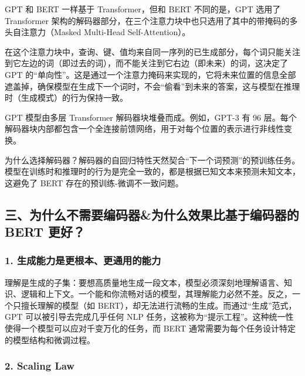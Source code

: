 GPT 和 BERT 一样基于 Transformer，但和 BERT 不同的是，GPT 选用了 Transformer 架构的解码器部分，在三个注意力块中也只选用了其中的带掩码的多头自注意力（Masked Multi-Head Self-Attention）。

在这个注意力块中，查询、键、值均来自同一序列的已生成部分，每个词只能关注到它左边的词（即过去的词），而不能关注到它右边（即未来）的词，这决定了 GPT 的``单向性''。这是通过一个注意力掩码来实现的，它将未来位置的信息全部遮盖掉，确保模型在生成下一个词时，不会``偷看''到未来的答案，这与模型在推理时（生成模式）的行为保持一致。

GPT 模型由多层 Transformer 解码器块堆叠而成。例如，GPT-3 有 96 层。每个解码器块内部都包含一个全连接前馈网络，用于对每个位置的表示进行非线性变换。

为什么选择解码器？解码器的自回归特性天然契合``下一个词预测''的预训练任务。模型在训练时和推理时的行为是完全一致的，都是根据已知文本来预测未知文本，这避免了 BERT 存在的预训练-微调不一致问题。

\hypertarget{ux4e09ux4e3aux4ec0ux4e48ux4e0dux9700ux8981ux7f16ux7801ux5668ux4e3aux4ec0ux4e48ux6548ux679cux6bd4ux57faux4e8eux7f16ux7801ux5668ux7684-bert-ux66f4ux597d}{%
\subsection{三、为什么不需要编码器\&为什么效果比基于编码器的 BERT 更好？}\label{ux4e09ux4e3aux4ec0ux4e48ux4e0dux9700ux8981ux7f16ux7801ux5668ux4e3aux4ec0ux4e48ux6548ux679cux6bd4ux57faux4e8eux7f16ux7801ux5668ux7684-bert-ux66f4ux597d}}

\hypertarget{ux751fux6210ux80fdux529bux662fux66f4ux6839ux672cux66f4ux901aux7528ux7684ux80fdux529b}{%
\subsubsection{1. 生成能力是更根本、更通用的能力}\label{ux751fux6210ux80fdux529bux662fux66f4ux6839ux672cux66f4ux901aux7528ux7684ux80fdux529b}}

理解是生成的子集：要想高质量地生成一段文本，模型必须深刻地理解语言、知识、逻辑和上下文。一个能和你流畅对话的模型，其理解能力必然不差。反之，一个只擅长理解的模型（如 BERT），却无法进行流畅的生成。而通过``生成''范式，GPT 可以被引导去完成几乎任何 NLP 任务，这被称为``提示工程''。这种统一性使得一个模型可以应对千变万化的任务，而 BERT 通常需要为每个任务设计特定的模型结构和微调过程。

\hypertarget{scaling-law}{%
\subsubsection{2. Scaling Law}\label{scaling-law}}

